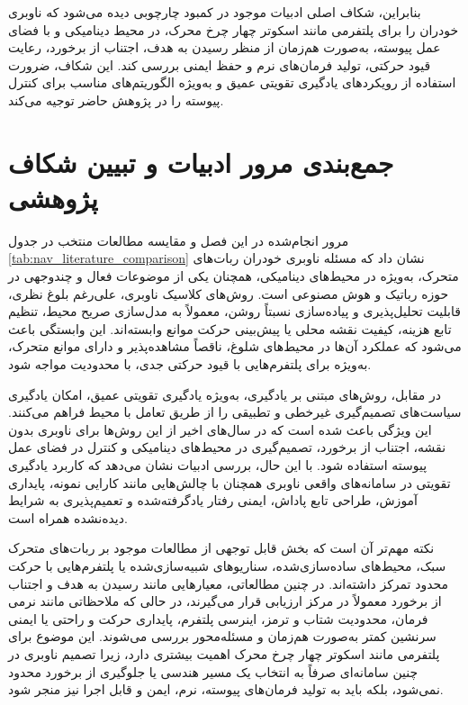 بنابراین، شکاف اصلی ادبیات موجود در کمبود چارچوبی دیده می‌شود که ناوبری خودران را برای پلتفرمی مانند اسکوتر چهار چرخ محرک، در محیط دینامیکی و با فضای عمل پیوسته، به‌صورت هم‌زمان از منظر رسیدن به هدف، اجتناب از برخورد، رعایت قیود حرکتی، تولید فرمان‌های نرم و حفظ ایمنی بررسی کند. این شکاف، ضرورت استفاده از رویکردهای یادگیری تقویتی عمیق و به‌ویژه الگوریتم‌های مناسب برای کنترل پیوسته را در پژوهش حاضر توجیه می‌کند.

\section{جمع‌بندی مرور ادبیات و تبیین شکاف پژوهشی}

مرور انجام‌شده در این فصل و مقایسه مطالعات منتخب در جدول \ref{tab:nav_literature_comparison} نشان داد که مسئله ناوبری خودران ربات‌های متحرک، به‌ویژه در محیط‌های دینامیکی، همچنان یکی از موضوعات فعال و چندوجهی در حوزه رباتیک و هوش مصنوعی است. روش‌های کلاسیک ناوبری، علی‌رغم بلوغ نظری، قابلیت تحلیل‌پذیری و پیاده‌سازی نسبتاً روشن، معمولاً به مدل‌سازی صریح محیط، تنظیم تابع هزینه، کیفیت نقشه محلی یا پیش‌بینی حرکت موانع وابسته‌اند. این وابستگی باعث می‌شود که عملکرد آن‌ها در محیط‌های شلوغ، ناقصاً مشاهده‌پذیر و دارای موانع متحرک، به‌ویژه برای پلتفرم‌هایی با قیود حرکتی جدی، با محدودیت مواجه شود.

در مقابل، روش‌های مبتنی بر یادگیری، به‌ویژه یادگیری تقویتی عمیق، امکان یادگیری سیاست‌های تصمیم‌گیری غیرخطی و تطبیقی را از طریق تعامل با محیط فراهم می‌کنند. این ویژگی باعث شده است که در سال‌های اخیر از این روش‌ها برای ناوبری بدون نقشه، اجتناب از برخورد، تصمیم‌گیری در محیط‌های دینامیکی و کنترل در فضای عمل پیوسته استفاده شود. با این حال، بررسی ادبیات نشان می‌دهد که کاربرد یادگیری تقویتی در سامانه‌های واقعی ناوبری همچنان با چالش‌هایی مانند کارایی نمونه، پایداری آموزش، طراحی تابع پاداش، ایمنی رفتار یادگرفته‌شده و تعمیم‌پذیری به شرایط دیده‌نشده همراه است.

نکته مهم‌تر آن است که بخش قابل توجهی از مطالعات موجود بر ربات‌های متحرک سبک، محیط‌های ساده‌سازی‌شده، سناریوهای شبیه‌سازی‌شده یا پلتفرم‌هایی با حرکت محدود تمرکز داشته‌اند. در چنین مطالعاتی، معیارهایی مانند رسیدن به هدف و اجتناب از برخورد معمولاً در مرکز ارزیابی قرار می‌گیرند، در حالی که ملاحظاتی مانند نرمی فرمان، محدودیت شتاب و ترمز، اینرسی پلتفرم، پایداری حرکت و راحتی یا ایمنی سرنشین کمتر به‌صورت هم‌زمان و مسئله‌محور بررسی می‌شوند. این موضوع برای پلتفرمی مانند اسکوتر چهار چرخ محرک اهمیت بیشتری دارد، زیرا تصمیم ناوبری در چنین سامانه‌ای صرفاً به انتخاب یک مسیر هندسی یا جلوگیری از برخورد محدود نمی‌شود، بلکه باید به تولید فرمان‌های پیوسته، نرم، ایمن و قابل اجرا نیز منجر شود.

